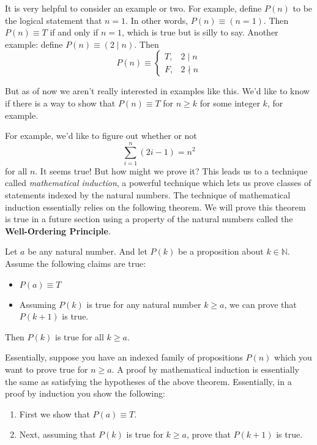 It is very helpful to consider an example or two. For example, define $P(n)$ to be the logical statement that $n = 1$. In other words, $P(n) \equiv (n = 1)$. Then $P(n) \equiv T$ if and only if $n = 1$, which is true but is silly to say. Another example: define $P(n) \equiv (2 \mid n)$. Then
\[P(n) \equiv \begin{cases}T, & 2 \mid n \\ F, & 2 \nmid n\end{cases}\]

But as of now we aren't really interested in examples like this. We'd like to know if there is a way to show that $P(n) \equiv T$ for $n \geq k$ for some integer $k$, for example.

For example, we'd like to figure out whether or not
\[\sum_{i = 1}^n(2i - 1) = n^2\] for all $n$. It seems true! But how might we prove it? This leads us to a technique called \textit{mathematical induction}, a powerful technique which lets us prove classes of statements indexed by the natural numbers. The technique of mathematical induction essentially relies on the following theorem. We will prove this theorem is true in a future section using a property of the natural numbers called the \textbf{Well-Ordering Principle}.

\begin{theorem}
Let $a$ be any natural number. And let $P(k)$ be a proposition about $k \in \mathbb{N}$. Assume the following claims are true:
\begin{itemize}
    \item $P(a) \equiv T$
    \item Assuming $P(k)$ is true for any natural number $k \geq a$, we can prove that $P(k + 1)$ is true.
\end{itemize}

Then $P(k)$ is true for all $k \geq a$.
\end{theorem}

Essentially, suppose you have an indexed family of propositions $P(n)$ which you want to prove true for $n \geq a$. A proof by mathematical induction is essentially the same as satisfying the hypotheses of the above theorem. Essentially, in a proof by induction you show the following:

\begin{enumerate}
    \item First we show that $P(a) \equiv T$.
    \item Next, assuming that $P(k)$ is true for $k \geq a$, prove that $P(k + 1)$ is true.
\end{enumerate}


